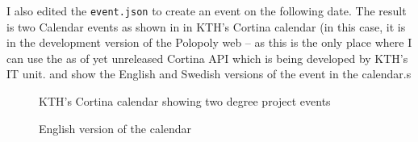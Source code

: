 I also edited the \texttt{event.json} to create an event on the following date. The result is two Calendar events as shown in  in KTH’s Cortina calendar (in this case, it is in the development version of the Polopoly web – as this is the only place where I can use the as of yet unreleased Cortina API which is being developed by KTH’s IT unit.  and  show the English and Swedish versions of the event in the calendar.s

\begin{figure}[!ht]
  \begin{center}
  \end{center}
  \caption{KTH’s Cortina calendar showing two degree project events}
  \label{fig:cortinaPicture1}
\end{figure}
\FloatBarrier

\begin{figure}[!ht]
  \begin{center}
  \end{center}
  \caption{English version of the calendar}
  \label{fig:cortinaPicture2}
\end{figure}
\FloatBarrier	

